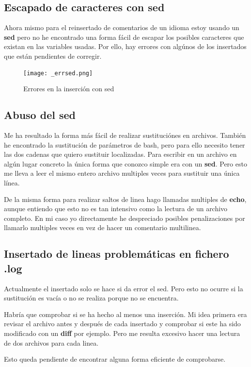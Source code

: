 \documentclass{article}
\begin{document}
    \subsection{Escapado de caracteres con sed}
        Ahora mismo para el reinsertado de comentarios de un idioma estoy usando un \textbf{sed} pero no he encontrado una forma fácil de escapar los posibles caracteres que existan en las variables usadas. Por ello, hay errores con algúnos de los insertados que están pendientes de corregir.

    \begin{figure}
        \centering
        \texttt{[image: \_errsed.png]}
        \caption{Errores en la inserción con sed}
    \end{figure}

    
    \subsection{Abuso del sed}
        Me ha resultado la forma más fácil de realizar sustituciónes en archivos. También he encontrado la sustitución de parámetros de bash, pero para ello necesito tener las dos cadenas que quiero sustituir localizadas. Para escribir en un archivo en algún lugar concreto la única forma que conozco simple era con un \textbf{sed}. Pero esto me lleva a leer el mismo entero archivo multiples veces para sustituir una única línea.

        De la misma forma para realizar saltos de linea hago llamadas multiples de \textbf{echo}, aunque entiendo que esto no es tan intensivo como la lectura de un archivo completo. En mi caso yo directamente he despreciado posibles penalizaciones por llamarlo multiples veces en vez de hacer un comentario multilinea.
    
    \subsection{Insertado de lineas problemáticas en fichero .log}
        Actualmente el insertado solo se hace si da error el sed. Pero esto no ocurre si la sustitución es vacía o no se realiza porque no se encuentra. 

        Habría que comprobar si se ha hecho al menos una inserción. Mi idea primera era revisar el archivo antes y después de cada insertado y comprobar si este ha sido modificado con un \textbf{diff} por ejemplo. Pero me resulta excesivo hacer una lectura de dos archivos para cada linea.

        Esto queda pendiente de encontrar alguna forma eficiente de comprobarse.
\end{document}
